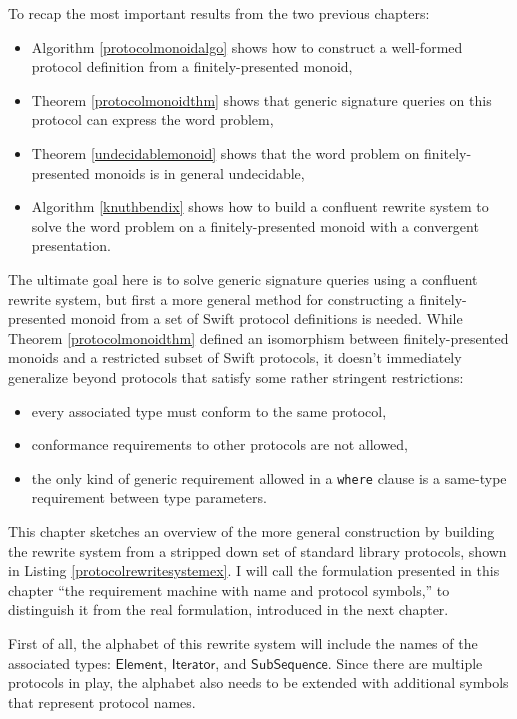 \documentclass[headsepline,bibliography=totoc]{scrreport}
\newcommand{\namesym}[1]{\mathsf{#1}}
\theoremstyle{definition}
\theoremstyle{definition}
\theoremstyle{definition}
\begin{document}
To recap the most important results from the two previous chapters:
\begin{itemize}
\item Algorithm \ref{protocolmonoidalgo} shows how to construct a well-formed protocol definition from a finitely-presented monoid,

\item Theorem \ref{protocolmonoidthm} shows that generic signature queries on this protocol can express the word problem,
\item Theorem \ref{undecidablemonoid} shows that the word problem on finitely-presented monoids is in general undecidable,
\item Algorithm \ref{knuthbendix} shows how to build a confluent rewrite system to solve the word problem on a finitely-presented monoid with a convergent presentation.
\end{itemize}
The ultimate goal here is to solve generic signature queries using a confluent rewrite system, but first a more general method for constructing a finitely-presented monoid from a set of Swift protocol definitions is needed. While Theorem \ref{protocolmonoidthm} defined an isomorphism between finitely-presented monoids and a restricted subset of Swift protocols, it doesn't immediately generalize beyond protocols that satisfy some rather stringent restrictions:
\begin{itemize}
\item every associated type must conform to the same protocol,
\item conformance requirements to other protocols are not allowed,
\item the only kind of generic requirement allowed in a \texttt{where} clause is a same-type requirement between type parameters.
\end{itemize}
This chapter sketches an overview of the more general construction by building the rewrite system from a stripped down set of standard library protocols, shown in Listing \ref{protocolrewritesystemex}. I will call the formulation presented in this chapter ``the requirement machine with name and protocol symbols,'' to distinguish it from the real formulation, introduced in the next chapter.

First of all, the alphabet of this rewrite system will include the names of the associated types: $\namesym{Element}$, $\namesym{Iterator}$, and $\namesym{SubSequence}$. Since there are multiple protocols in play, the alphabet also needs to be extended with additional symbols that represent protocol names.
\end{document}
